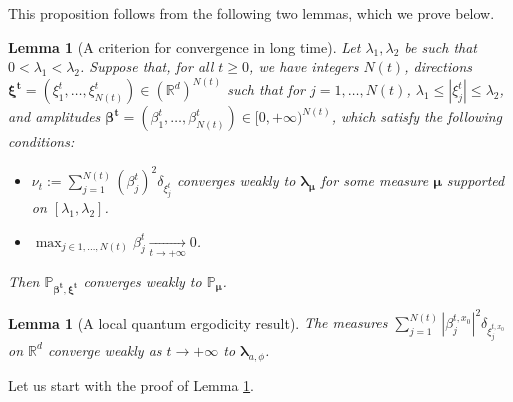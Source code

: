 \documentclass[10pt]{amsart}
\theoremstyle{plain}
\newtheorem{lemma}[theorem]{Lemma}
\theoremstyle{definition}
\newcommand{\R}{\mathbb{R}}
\begin{document}
This proposition follows from the following two lemmas, which we prove below.

\begin{lemma}[A criterion for convergence in long time]\label{lem:WeakConv2}
Let $\lambda_1,\lambda_2$ be such that $0<\lambda_1<\lambda_2$.
Suppose that, for all $t\geq 0$, we have integers $N(t)$, directions $\boldsymbol{\xi^t}= (\xi_1^t,\dots, \xi_{N(t)}^t) \in \left(\R^d\right)^{N(t)}$ such that for $j=1,\dots,N(t)$, $\lambda_1\leq |\xi_j^t|\leq \lambda_2$, and amplitudes $\boldsymbol{\beta^t}= (\beta_1^{t},\dots, \beta_{N(t)}^t) \in [0, +\infty)^{N(t)}$, which satisfy the following conditions:
\begin{itemize}
\item $\nu_t:= \sum_{j=1}^{N(t)} (\beta^t_j)^2 \delta_{\xi^t_j}$ converges weakly to $\boldsymbol{\lambda_\mu}$ for some measure $\boldsymbol{\mu}$ supported on $[\lambda_1,\lambda_2]$.
\item $\max_{j\in 1,\dots, N(t)} \beta_j^t \underset{t\to +\infty}{\to} 0$.
\end{itemize}
Then $\mathbb{P}_{\boldsymbol{\beta^t}, \boldsymbol{\xi^t}}$ converges weakly to $\mathbb{P}_{\boldsymbol{\mu}}$.
\end{lemma}

\begin{lemma}[A local quantum ergodicity result]\label{lem:EquidSCPonct}
The measures $\sum_{j=1}^{N(t)} |\beta^{t,x_0}_j|^2 \delta_{\xi^{t,x_0}_j}$ on $\R^d$ converge weakly as $t\to +\infty$ to $\boldsymbol{\lambda}_{a,\phi}$.
\end{lemma}

Let us start with the proof of Lemma \ref{lem:WeakConv2}.
\end{document}
